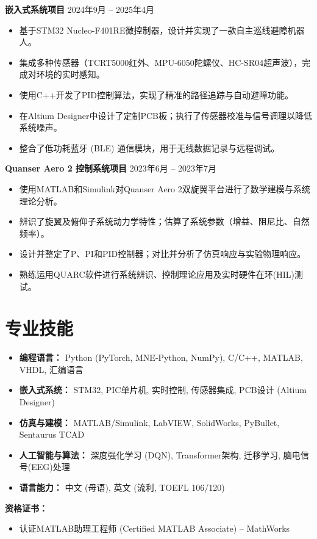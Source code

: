 \documentclass[11pt, a4paper]{article}
\newcommand{\entry}[2]{\textbf{#1} \hfill #2}
\begin{document}
\vspace{4pt}
\entry{嵌入式系统项目}{2024年9月 -- 2025年4月}
\begin{itemize}[leftmargin=*, nosep, topsep=2pt]
    \item 基于STM32 Nucleo-F401RE微控制器，设计并实现了一款自主巡线避障机器人。
    \item 集成多种传感器（TCRT5000红外、MPU-6050陀螺仪、HC-SR04超声波），完成对环境的实时感知。
    \item 使用C++开发了PID控制算法，实现了精准的路径追踪与自动避障功能。
    \item 在Altium Designer中设计了定制PCB板；执行了传感器校准与信号调理以降低系统噪声。
    \item 整合了低功耗蓝牙 (BLE) 通信模块，用于无线数据记录与远程调试。
\end{itemize}

\vspace{4pt}
\entry{Quanser Aero 2 控制系统项目}{2023年6月 -- 2023年7月}
\begin{itemize}[leftmargin=*, nosep, topsep=2pt]
    \item 使用MATLAB和Simulink对Quanser Aero 2双旋翼平台进行了数学建模与系统理论分析。
    \item 辨识了旋翼及俯仰子系统动力学特性；估算了系统参数（增益、阻尼比、自然频率）。
    \item 设计并整定了P、PI和PID控制器；对比并分析了仿真响应与实验物理响应。
    \item 熟练运用QUARC软件进行系统辨识、控制理论应用及实时硬件在环(HIL)测试。
\end{itemize}

\section{专业技能}
\begin{itemize}[leftmargin=*, nosep, topsep=2pt]
    \item \textbf{编程语言：} Python (PyTorch, MNE-Python, NumPy), C/C++, MATLAB, VHDL, 汇编语言
    \item \textbf{嵌入式系统：} STM32, PIC单片机, 实时控制, 传感器集成, PCB设计 (Altium Designer)
    \item \textbf{仿真与建模：} MATLAB/Simulink, LabVIEW, SolidWorks, PyBullet, Sentaurus TCAD
    \item \textbf{人工智能与算法：} 深度强化学习 (DQN), Transformer架构, 迁移学习, 脑电信号(EEG)处理
    \item \textbf{语言能力：} 中文 (母语), 英文 (流利, TOEFL 106/120)
\end{itemize}

\vspace{4pt}
\textbf{资格证书：}
\begin{itemize}[leftmargin=*, nosep, topsep=2pt]
    \item 认证MATLAB助理工程师 (Certified MATLAB Associate) -- MathWorks
\end{itemize}
\end{document}
